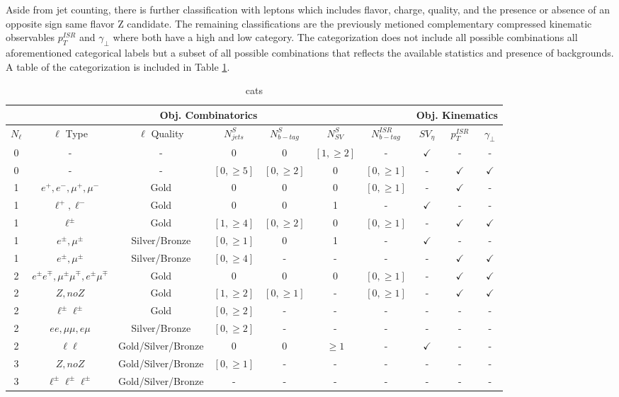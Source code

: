 Aside from jet counting, there is further classification with leptons which includes flavor, charge, quality, and the presence or absence of an opposite sign same flavor Z candidate. The remaining classifications are the previously metioned complementary compressed kinematic observables $p_T^{ISR}$ and $\gamma_\perp$ where both have a high and low category.    The categorization does not include all possible combinations all aforementioned categorical labels but a subset of all possible combinations that reflects the available statistics and presence of backgrounds. A  table of the categorization is included in Table \ref{tab:cats}. 
\begin{table}
\centering
\label{tab:cats}
\caption{cats}
\begin{tabular}{|c|c|c|c|c|c|c|c|c|c|}
\multicolumn{7}{c|}{Obj. Combinatorics} & \multicolumn{3}{c}{Obj. Kinematics} \\
\hline 
$N_\ell$ &  $\ell$ Type & $\ell$ Quality & $N_{jets}^{S}$ & $N_{b-tag}^{S}$ & $N_{SV}^S$ & $N_{b-tag}^{ISR}$ & $SV_\eta$ & $p_T^{ISR}$ & $\gamma_\perp$ \\ 
\hline
\hline 
0 & - & - & 0 & 0 & $[1,\geq 2]$ & - & $\checkmark$ & - & - \\ 
 
0 & - & - & $[0,\geq 5]$ & $[0,\geq 2]$ & 0 & $[0,\geq 1]$ & - & $\checkmark$ & $\checkmark$ \\
\hline 
1 & $e^+,e^-,\mu^+,\mu^-$& Gold & 0 & 0 & 0 & $[0,\geq 1]$ & - & $\checkmark$ & - \\
1 & $\ell^+, \ell^-$  & Gold & 0 & 0 & 1 & - & $\checkmark$ & - & - \\
1 & $\ell^\pm$ & Gold & $[1,\geq 4]$ & $[0,\geq 2]$ & 0 & $[0,\geq 1]$ & - & $\checkmark$ & $\checkmark$ \\
1 & $e^\pm, \mu^\pm$ & Silver/Bronze & $[0,\geq 1]$ & 0 & 1 & - & $\checkmark$ & - & - \\
1 & $e^\pm, \mu^\pm$ & Silver/Bronze & $[0, \geq 4]$ & - & - & - & - & $\checkmark$ & $\checkmark$ \\
\hline
2 & $e^\pm e^\mp, \mu^\pm \mu^\mp, e^\pm \mu^\mp $ & Gold & 0 & 0 & 0 & $[0,\geq 1]$ & - & $\checkmark$ & $\checkmark$ \\
2 & $Z, no Z$ & Gold & $[1,\geq 2]$ & $[0, \geq 1]$& - & $[0,\geq 1]$ & - & $\checkmark$ & $\checkmark$ \\
2 & $\ell^\pm \ell^\pm$ & Gold & $[0,\geq 2]$ & - & - &  - & - & - & - \\
2 & $ee, \mu\mu, e\mu$ & Silver/Bronze & $[0,\geq 2]$ & - & - & - & - & - & - \\
2 & $\ell \ell$ & Gold/Silver/Bronze & 0 & 0 & $\geq 1 $ & - & $\checkmark$ & - & - \\
\hline
3 & $Z, no Z$ & Gold/Silver/Bronze & $[0,\geq 1]$ & - & - & - & - & - & - \\
3 & $\ell^\pm \ell^\pm \ell^\pm$ & Gold/Silver/Bronze & - & - & -& - & - & -& - \\
\hline
\end{tabular} 
\end{table}\\

